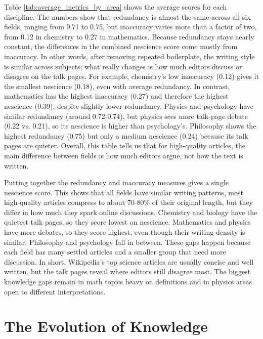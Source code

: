 Table \ref{tab:average_metrics_by_area} shows the average scores for each discipline. The numbers show that redundancy is almost the same across all six fields, ranging from 0.71 to 0.75, but inaccuracy varies more than a factor of two, from 0.12 in chemistry to 0.27 in mathematics. Because redundancy stays nearly constant, the differences in the combined nescience score come mostly from inaccuracy. In other words, after removing repeated boilerplate, the writing style is similar across subjects; what really changes is how much editors discuss or disagree on the talk pages. For example, chemistry's low inaccuracy (0.12) gives it the smallest nescience (0.18), even with average redundancy. In contrast, mathematics has the highest inaccuracy (0.27) and therefore the highest nescience (0.39), despite slightly lower redundancy. Physics and psychology have similar redundancy (around 0.72-0.74), but physics sees more talk-page debate (0.22 vs. 0.21), so its nescience is higher than psychology's. Philosophy shows the highest redundancy (0.75) but only a medium nescience (0.24) because its talk pages are quieter. Overall, this table tells us that for high-quality articles, the main difference between fields is how much editors argue, not how the text is written.

Putting together the redundancy and inaccuracy measures gives a single nescience score. This shows that all fields have similar writing patterns, most high‑quality articles compress to about 70-80\% of their original length, but they differ in how much they spark online discussions. Chemistry and biology have the quietest talk pages, so they score lowest on nescience. Mathematics and physics have more debates, so they score highest, even though their writing density is similar. Philosophy and psychology fall in between. These gaps happen because each field has many settled articles and a smaller group that need more discussion. In short, Wikipedia's top science articles are usually concise and well written, but the talk pages reveal where editors still disagree most. The biggest knowledge gaps remain in math topics heavy on definitions and in physics areas open to different interpretations.

%
%

\section{The Evolution of Knowledge}

